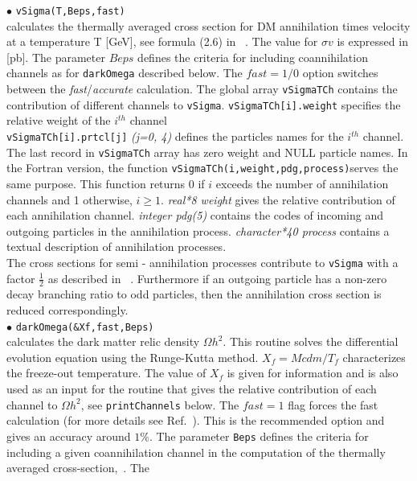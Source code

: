 \documentclass[12pt,a4paper]{article}
\begin{document}
$\bullet$ \verb|vSigma(T,Beps,fast)|\\
calculates the thermally averaged cross section for DM annihilation  times velocity  
at a  temperature T [GeV], see formula (2.6) in ~\cite{Belanger:2001fz}. The value for $\sigma v$ 
is expressed in [pb].  The parameter $Beps$ defines the criteria for including coannihilation
channels as for {\tt darkOmega} described below.
The $fast=1/0$ option switches between the {\it fast}/{\it accurate} calculation. 
The global array {\tt vSigmaTCh} contains the 
contribution of different channels to {\tt vSigma}. \verb|vSigmaTCh[i].weight| specifies the relative
weight of the $i^{th}$ channel \\
\verb|vSigmaTCh[i].prtcl[j]|  {\it (j=0, 4)}  defines the particles names for the $i^{th}$
channel.\\
The last record in \verb|vSigmaTCh| array has zero weight and 
NULL particle names.  In the Fortran version, the function 
 \verb|vSigmaTCh(i,weight,pdg,process)|serves the same purpose.  This function returns 0
if $i$  exceeds the number of annihilation  channels and 1 otherwise, $i\ge 1$. 
 {\it real*8 weight} gives the relative contribution of each
annihilation channel. {\it integer pdg(5)} contains the codes of incoming and
outgoing particles in the  annihilation process.  {\it character*40  process}
contains a textual description of annihilation processes.\\
The cross sections for  semi - annihilation processes  contribute to {\tt vSigma} with a
factor $\frac{1}{2}$ as described in ~\cite{Belanger:2012vp}. Furthermore if an outgoing particle has a non-zero
decay branching ratio to  odd particles, then the  annihilation  cross section  is reduced
correspondingly.\\    
\noindent 
$\bullet$ \verb|darkOmega(&Xf,fast,Beps)|\\
calculates the dark matter relic density $\Omega h^2$. 
This routine  solves the differential evolution equation  using the Runge-Kutta method. 
$X_f=Mcdm/T_{f}$
characterizes the freeze-out temperature.   The value of $X_f$ is given for
information and is also used as an input for the routine that
gives the relative contribution of each channel to $\Omega h^2$,
see \verb|printChannels|  below. The  $fast=1$ flag forces the
fast calculation (for more details see
Ref.~\cite{Belanger:2004yn}). This is the recommended option and
gives an accuracy around $1\%$. The parameter {\tt Beps} defines the
criteria for including a given coannihilation channel in the computation of the
thermally averaged cross-section,~\cite{Belanger:2004yn}.   The
\end{document}
